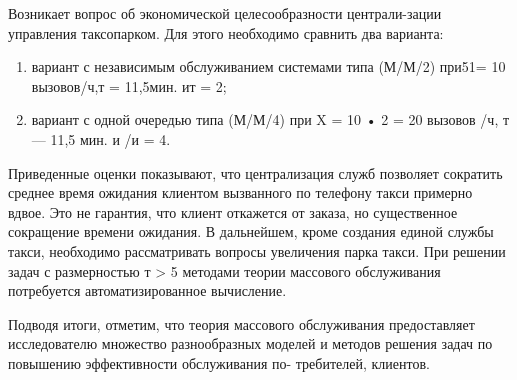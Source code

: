 Возникает вопрос об экономической целесообразности централи-зации управления таксопарком. Для этого необходимо сравнить два варианта:
\begin{enumerate}
	\item вариант с независимым обслуживанием системами типа (М/М/2) при51= 10 вызовов/ч,т = 11,5мин. ит = 2;
	\item вариант с одной очередью типа (М/М/4) при X = 10 • 2 = 20 вызовов /ч, т — 11,5 мин. и /и = 4.
\end{enumerate}

Приведенные оценки показывают, что централизация служб позволяет сократить среднее время ожидания клиентом вызванного по телефону такси примерно вдвое. Это не гарантия, что клиент откажется от заказа, но существенное сокращение времени ожидания. В дальнейшем, кроме создания единой службы такси, необходимо рассматривать вопросы увеличения парка такси. При решении задач с размерностью т > 5 методами теории массового обслуживания потребуется автоматизированное вычисление.

Подводя итоги, отметим, что теория массового обслуживания предоставляет исследователю множество разнообразных моделей и методов решения задач по повышению эффективности обслуживания по-
требителей, клиентов.